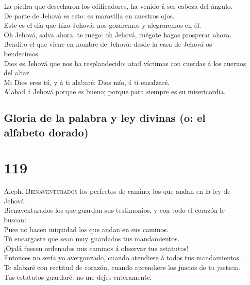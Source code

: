  La piedra que desecharon los edificadores, ha venido á
ser cabeza del ángulo.\\
 De parte de Jehová es esto: es maravilla en nuestros
ojos.\\
 Este es el día que hizo Jehová: nos gozaremos y
alegraremos en él.\\
 Oh Jehová, salva ahora, te ruego: oh Jehová, ruégote
hagas prosperar ahora.\\
 Bendito el que viene en nombre de Jehová: desde la casa
de Jehová os bendecimos.\\
 Dios es Jehová que nos ha resplandecido: atad víctimas
con cuerdas á los cuernos del altar.\\
 Mi Dios eres tú, y á ti alabaré: Dios mío, á ti
ensalzaré.\\
 Alabad á Jehová porque es bueno; porque para siempre es
su misericordia.

\hypertarget{gloria-de-la-palabra-y-ley-divinas-o-el-alfabeto-dorado}{%
\subsection{Gloria de la palabra y ley divinas (o: el alfabeto
dorado)}\label{gloria-de-la-palabra-y-ley-divinas-o-el-alfabeto-dorado}}

\hypertarget{section-118}{%
\section{119}\label{section-118}}

 Aleph. \textsc{Bienaventurados} los perfectos de camino;
los que andan en la ley de Jehová.\\
 Bienaventurados los que guardan sus testimonios, y con
todo el corazón le buscan:\\
 Pues no hacen iniquidad los que andan en sus caminos.\\
 Tú encargaste que sean muy guardados tus mandamientos.\\
 ¡Ojalá fuesen ordenados mis caminos á observar tus
estatutos!\\
 Entonces no sería yo avergonzado, cuando atendiese á
todos tus mandamientos.\\
 Te alabaré con rectitud de corazón, cuando aprendiere los
juicios de tu justicia.\\
 Tus estatutos guardaré: no me dejes enteramente.

